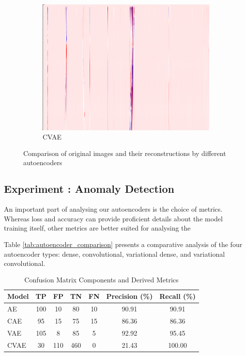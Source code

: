 \begin{figure}[!h]
\begin{subfigure}{0.33\textwidth}
        \includegraphics[width=\textwidth]{figures/test.png}
        \caption{CVAE}
    \end{subfigure}
    
    \caption{Comparison of original images and their reconstructions by different autoencoders}
    \label{fig:aereconstruct}
\end{figure}

\subsection{Experiment : Anomaly Detection}

An important part of analysing our autoencoders is the choice of metrics. Whereas loss and accuracy can provide proficient details about the model training itself, other metrics are better suited for analysing the 

Table \ref{tab:autoencoder_comparison} presents a comparative analysis of the four autoencoder types: dense, convolutional, variational dense, and variational convolutional.





\begin{table}[!htbp]
\centering
\label{tab:confusion-matrix-results}
\begin{tabular}{l
    S[table-format=3.0]
    S[table-format=3.0]
    S[table-format=3.0]
    S[table-format=3.0]
    S[table-format=3.2]
    S[table-format=3.2]
}
\toprule
\textbf{Model} & {\textbf{TP}} & {\textbf{FP}} & {\textbf{TN}} & {\textbf{FN}} & {\textbf{Precision (\%)}} & {\textbf{Recall (\%)}} \\
\midrule
{} AE   & 100 & 10 & 80 & 10 & 90.91 & 90.91 \\
CAE  & 95 & 15 & 75 & 15 & 86.36 & 86.36 \\
 VAE  & 105 & 8 & 85 & 5 & 92.92 & 95.45 \\
CVAE & 30 & 110 & 460 & 0 & 21.43 & 100.00 \\
\bottomrule
\end{tabular}
\caption{Confusion Matrix Components and Derived Metrics}
\end{table}


